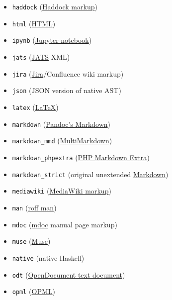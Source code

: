 \documentclass[
  b5paper
]{book}
\begin{document}
\begin{description}
\begin{itemize}
  \texttt{gfm}
  (\href{https://help.github.com/articles/github-flavored-markdown/}{GitHub-Flavored
  Markdown}), or the deprecated and less accurate
  \texttt{markdown\_github}; use
  \hyperref[markdown-variants]{\texttt{markdown\_github}} only if you
  need extensions not supported in
  \hyperref[markdown-variants]{\texttt{gfm}}.
\item
  \texttt{haddock}
  (\href{https://www.haskell.org/haddock/doc/html/ch03s08.html}{Haddock
  markup})
\item
  \texttt{html} (\href{https://www.w3.org/html/}{HTML})
\item
  \texttt{ipynb}
  (\href{https://nbformat.readthedocs.io/en/latest/}{Jupyter notebook})
\item
  \texttt{jats} (\href{https://jats.nlm.nih.gov}{JATS} XML)
\item
  \texttt{jira}
  (\href{https://jira.atlassian.com/secure/WikiRendererHelpAction.jspa?section=all}{Jira}/Confluence
  wiki markup)
\item
  \texttt{json} (JSON version of native AST)
\item
  \texttt{latex} (\href{https://www.latex-project.org/}{LaTeX})
\item
  \texttt{markdown} (\hyperref[pandocs-markdown]{Pandoc's Markdown})
\item
  \texttt{markdown\_mmd}
  (\href{https://fletcherpenney.net/multimarkdown/}{MultiMarkdown})
\item
  \texttt{markdown\_phpextra}
  (\href{https://michelf.ca/projects/php-markdown/extra/}{PHP Markdown
  Extra})
\item
  \texttt{markdown\_strict} (original unextended
  \href{https://daringfireball.net/projects/markdown/}{Markdown})
\item
  \texttt{mediawiki}
  (\href{https://www.mediawiki.org/wiki/Help:Formatting}{MediaWiki
  markup})
\item
  \texttt{man} (\href{https://man.cx/groff_man(7)}{roff man})
\item
  \texttt{mdoc} (\href{https://mandoc.bsd.lv/man/mdoc.7.html}{mdoc}
  manual page markup)
\item
  \texttt{muse} (\href{https://amusewiki.org/library/manual}{Muse})
\item
  \texttt{native} (native Haskell)
\item
  \texttt{odt}
  (\href{https://en.wikipedia.org/wiki/OpenDocument}{OpenDocument text
  document})
\item
  \texttt{opml} (\href{http://dev.opml.org/spec2.html}{OPML})

\end{itemize}
\end{description}
\end{document}
